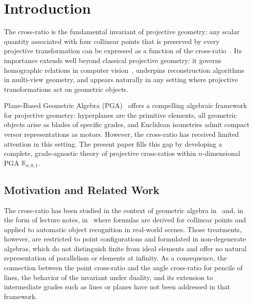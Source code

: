 \documentclass{birkjour}
\theoremstyle{definition}
\theoremstyle{remark}
\begin{document}

\section{Introduction}
\label{sec:intro}
The cross-ratio is the fundamental invariant of projective geometry:
any scalar quantity associated with four collinear points that is
preserved by every projective transformation can be expressed as a
function of the cross-ratio~\cite{stillwell}. Its importance extends
well beyond classical projective geometry: it governs homographic
relations in computer vision~\cite{hartley2003multiple}, underpins
reconstruction algorithms in multi-view geometry, and appears
naturally in any setting where projective transformations act on
geometric objects.

Plane-Based Geometric Algebra
(PGA)~\cite{gunn2011geometrykinematicsrigidbody,
gunn2011homogeneousmodeleuclideangeometry} offers a compelling
algebraic framework for projective geometry: hyperplanes are the
primitive elements, all geometric objects arise as blades of specific
grades, and Euclidean isometries admit compact versor representations
as motors. However, the cross-ratio has received limited attention in
this setting. The present paper fills this gap by developing a
complete, grade-agnostic theory of projective cross-ratios within
$n$-dimensional PGA $\mathbb{R}_{n,0,1}$.

\subsection{Motivation and Related Work}
\label{sec:motivation}
The cross-ratio has been studied in the context of geometric algebra
in~\cite{bayro2002geometric,lasenby1999analysis} and, in the form of lecture notes, in~\cite{lundholm2009clifford}
where formulas are derived for collinear points and applied to
automatic object recognition in real-world scenes. Those treatments,
however, are restricted to point configurations and formulated in
non-degenerate algebras, which do not
distinguish finite from ideal elements and offer no natural
representation of parallelism or elements at infinity. As a
consequence, the connection between the point cross-ratio and the
angle cross-ratio for pencils of lines, the behavior of the invariant
under duality, and its extension to intermediate grades such as lines
or planes have not been addressed in that framework.
\end{document}

